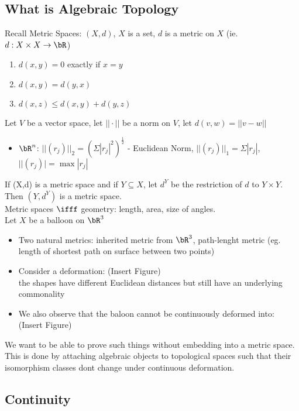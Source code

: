 
\subsection{What is Algebraic Topology}


Recall Metric Spaces: $(X, d)$, $X$ is a set, $d$ is a metric on $X$ (ie. $d: X \times X \to \bR$)
\begin{enumerate}
    \item $d(x,y)=0$ exactly if $x=y$
    \item $d(x,y) = d(y,x)$
    \item $d(x,z) \le d(x,y) + d(y,z)$ 
\end{enumerate}

\noindent
Let $V$ be a vector space, let $|| \cdot ||$ be a norm on $V$, let $d(v,w) = ||v-w||$ 
\begin{itemize}
    \item $\bR^n$: $||(r_j)||_2 = (\Sigma |r_j|^2)^{\frac{1}{2}}$ - Euclidean Norm, $||(r_j)||_1 = \Sigma |r_j|$, $||(r_j)| = \max {|r_j|}$
\end{itemize}

\noindent
If (X,d) is a metric space and if $Y \subseteq X$, let $d^Y$ be the restriction of $d$ to $Y \times Y$. Then $(Y, d^Y)$ is a metric space. \\

\noindent
Metric spaces $\ifff$ geometry: length, area, size of angles. \\

\noindent
Let $X$ be a balloon on $\bR^3$
\begin{itemize}
    \item Two natural metrics: inherited metric from $\bR^3$, path-lenght metric (eg. length of shortest path on surface between two points) 
    \item Consider a deformation: (Insert Figure) \\
        the shapes have different Euclidean distances but still have an underlying commonality 
    \item We also observe that the baloon cannot be continuously deformed into: (Insert Figure)
\end{itemize}

\noindent
We want to be able to prove such things without embedding into a metric space. This is done by attaching algebraic objects to topological spaces such that their isomorphism classes dont change under continuous deformation. 

\subsection{Continuity} 

